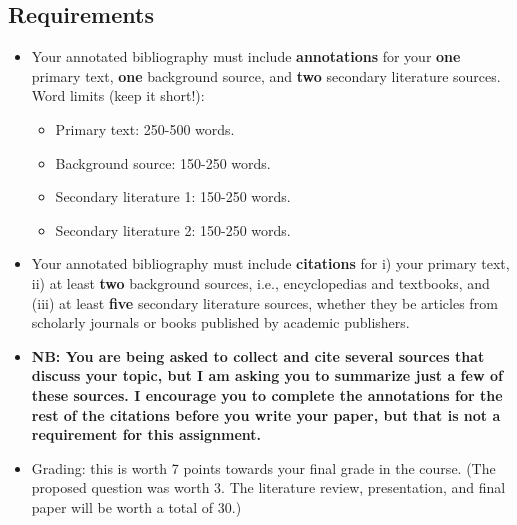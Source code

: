 \documentclass[oneside]{article}
\begin{document}
\subsection*{Requirements}\label{header-n55}

\begin{itemize}
\item
  Your annotated bibliography must include \textbf{annotations} for your \textbf{one}
  primary text, \textbf{one} background source, and \textbf{two}
  secondary literature sources. Word limits (keep it short!):

  \begin{itemize}
  \item
    Primary text: 250-500 words.
  \item
    Background source: 150-250 words.
  \item
    Secondary literature 1: 150-250 words.
  \item
    Secondary literature 2: 150-250 words.
  \end{itemize}
\item
  Your annotated bibliography must include \textbf{citations} for i)
  your primary text, ii) at least \textbf{two} background sources, i.e.,
  encyclopedias and textbooks, and (iii) at least \textbf{five}
  secondary literature sources, whether they be articles from scholarly
  journals or books published by academic publishers.
\item
  \textbf{NB: You are being asked to collect and cite several sources
  that discuss your topic, but I am asking you to summarize just a few
  of these sources. I encourage you to complete the annotations for the
  rest of the citations before you write your paper, but that is not a
  requirement for this assignment.} 
\item
  Grading: this is worth 7 points towards your final grade in the
  course. (The proposed question was worth 3. The literature review,
  presentation, and final paper will be worth a total of 30.)
 
\end{itemize}
\end{document}
